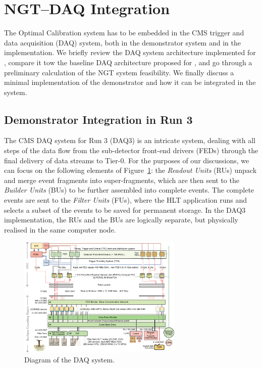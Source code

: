 \section{NGT--DAQ Integration} %


The Optimal Calibration system has to be embedded in the CMS trigger and data acquisition (DAQ) system,
both in the demonstrator system and in the \Phasetwo implementation.
We briefly review the DAQ system architecture implemented for \Runthree, 
compare it tow the baseline DAQ architecture proposed for \Phasetwo, and 
go through a preliminary calculation of the NGT system feasibility.
We finally discuss a minimal implementation of the demonstrator and
how it can be integrated in the \Runthree system.

\subsection{Demonstrator Integration in Run 3}

The CMS DAQ system for Run 3 (DAQ3) is an intricate system, dealing with all steps of the data flow from the sub-detector front-end drivers (FEDs) through the final delivery of data streams to Tier-0. For the purposes of our discussions, we can focus on the following elements of Figure~\ref{fig:DAQ3}: 
the \emph{Readout Units} (RUs) unpack and merge event fragments into super-fragments, which are then sent to the \emph{Builder Units} (BUs) to be further assembled into complete events. 
The complete events are sent to the \emph{Filter Units} (FUs), where the HLT application runs and selects a subset of the events to be saved for permanent storage. 
In the DAQ3 implementation, the RUs and the BUs are logically separate, but physically realised in the same computer node.
\begin{figure}[htbp]
   \centering
	\includegraphics[width=0.7\textwidth]{figures/DAQRun3.pdf}
  \caption{Diagram of the \Runthree DAQ system.}
   \label{fig:DAQ3}
\end{figure}

